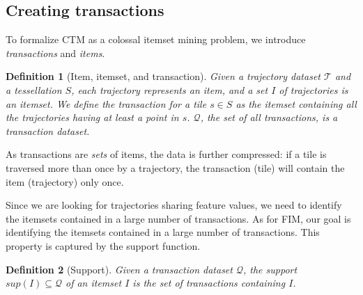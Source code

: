 \documentclass[
]{ceurart}
\newtheorem{example}{Example}
\newtheorem{definition}{Definition}
\begin{document}


\subsection{Creating transactions}

To formalize CTM as a colossal itemset mining problem, we introduce \textit{transactions} and \textit{items}.

\begin{definition}[Item, itemset, and transaction] Given a trajectory dataset $\mathcal{T}$ and a tessellation $S$, each trajectory represents an \textit{item}, and a set $I$ of trajectories is an \textit{itemset}.
We define the \textit{transaction} for a tile $s \in S$ as the itemset containing all the trajectories having at least a point in $s$.
$\mathcal{Q}$, the set of all transactions, is a transaction dataset.
\end{definition}

As transactions are \textit{sets} of items, the data is further compressed: if a tile is traversed more than once by a trajectory, the transaction (tile) will contain the item (trajectory) only once.

Since we are looking for trajectories sharing feature values, we need to identify the itemsets contained in a large number of transactions. 
As for FIM, our goal is identifying the itemsets contained in a large number of transactions.
This property is captured by the support function.

\begin{definition}[Support]
Given a transaction dataset $\mathcal{Q}$, the \textit{support} $sup(I)\subseteq\mathcal{Q}$ of an itemset $I$ is the set of transactions containing $I$.
\end{definition}
\end{document}
